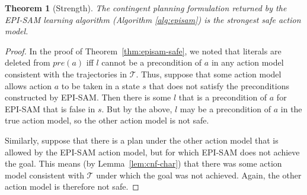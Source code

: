 \documentclass[letterpaper]{article} %
\newtheorem{theorem}{Theorem}
\newcommand{\pre}{\textit{pre}}
\newcommand{\eff}{\textit{eff}}
\newcommand{\ispre}{\textit{IsPre}}
\begin{document}
\begin{theorem}[Strength]
The contingent planning formulation returned by the EPI-SAM learning algorithm (Algorithm \ref{alg:episam}) is the strongest safe action model.
\end{theorem}
\begin{proof}
In the proof of Theorem~\ref{thm:episam-safe}, we noted that literals are deleted from $\pre(a)$
iff $l$ cannot be a precondition of $a$ in any action model consistent with the trajectories in $\mathcal{T}$. Thus, suppose that some action model allows action $a$ to be taken in a state $s$ that does not satisfy the preconditions constructed by EPI-SAM. Then there is some $l$ that is a precondition of $a$ for EPI-SAM that is false in $s$. But by the above,
$l$ may be a precondition of $a$ in the true action model, so the other action model is not safe. 

Similarly, suppose that there is a plan under the other action model that is allowed by the EPI-SAM action model, but for which EPI-SAM does not achieve the goal. This means (by Lemma~\ref{lem:cnf-char}) that there was some action model consistent with $\mathcal{T}$ under which the goal was not achieved. Again, the other action model is therefore not safe.
\end{proof}

\end{document}
